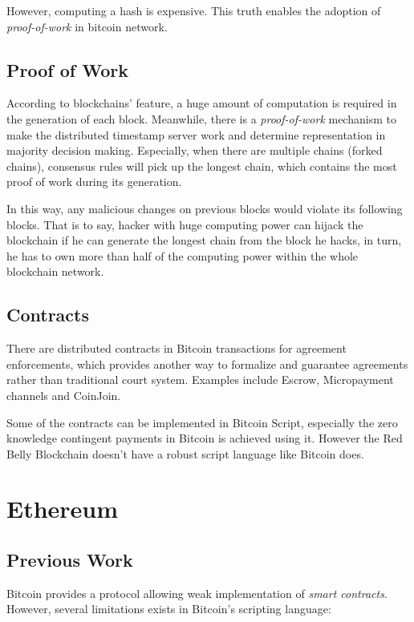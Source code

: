 \documentclass[12pt]{article}
\begin{document}
However, computing a hash is expensive. This truth enables the adoption of \textit{proof-of-work} in bitcoin network. 

\subsection{Proof of Work}

According to blockchains' feature, a huge amount of computation is required in the generation of each block. Meanwhile, there is a \textit{proof-of-work} mechanism to make the distributed timestamp server work and determine representation in majority decision making. Especially, when there are multiple chains (forked chains), consensus rules will pick up the longest chain, which contains the most proof of work during its generation.

In this way, any malicious changes on previous blocks would violate its following blocks. That is to say, hacker with huge computing power can hijack the blockchain if he can generate the longest chain from the block he hacks, in turn, he has to own more than half of the computing power within the whole blockchain network.

\subsection{Contracts}

There are distributed contracts in Bitcoin transactions for agreement enforcements, which provides another way to formalize and guarantee agreements rather than traditional court system. Examples include Escrow, Micropayment channels and CoinJoin.

Some of the contracts can be implemented in Bitcoin Script, especially the zero knowledge contingent payments in Bitcoin is achieved using it. However the Red Belly Blockchain doesn't have a robust script language like Bitcoin does.

\section{Ethereum}

\subsection{Previous Work}

Bitcoin provides a protocol allowing weak implementation of \textit{smart contracts}. However, several limitations exists in Bitcoin's scripting language:
\end{document}
